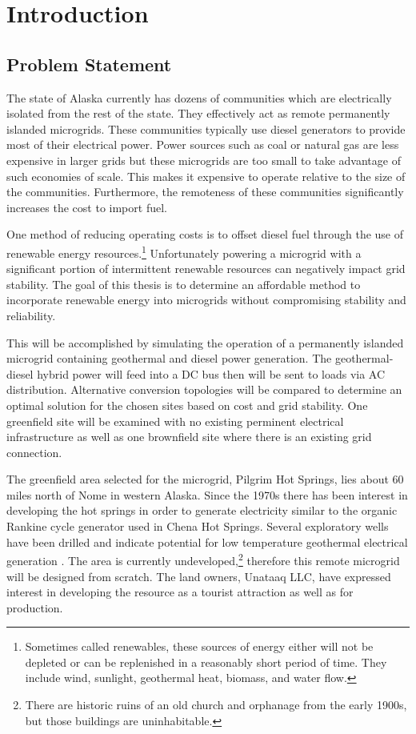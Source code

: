 \chapter{Introduction}
\label{ch:intro}

\section{Problem Statement}
The state of Alaska currently has dozens of communities which are electrically isolated from the rest of the state. They effectively act as remote permanently islanded microgrids. These communities typically use diesel generators to provide most of their electrical power. Power sources such as coal or natural gas are less expensive in larger grids but these microgrids are too small to take advantage of such economies of scale. This makes it expensive to operate relative to the size of the communities. Furthermore, the remoteness of these communities significantly increases the cost to import fuel.

One method of reducing operating costs is to offset diesel fuel through the use of renewable energy resources.\footnote{Sometimes called renewables, these sources of energy either will not be depleted or can be replenished in a reasonably short period of time. They include wind, sunlight, geothermal heat, biomass, and water flow.} Unfortunately powering a microgrid with a significant portion of intermittent renewable resources can negatively impact grid stability. The goal of this thesis is to determine an affordable method to incorporate renewable energy into microgrids without compromising stability and reliability. 

This will be accomplished by simulating the operation of a permanently islanded microgrid containing geothermal and diesel power generation. The geo\-ther\-mal\--die\-sel hybrid power will feed into a DC bus then will be sent to loads via AC distribution. Alternative conversion topologies will be compared to determine an optimal solution for the chosen sites based on cost and grid stability. One greenfield site will be examined with no existing perminent electrical infrastructure as well as one brownfield site where there is an existing grid connection.

The greenfield area selected for the microgrid, Pilgrim Hot Springs, lies about 60 miles north of Nome in western Alaska. Since the 1970s there has been interest in developing the hot springs in order to generate electricity similar to the organic Rankine cycle generator used in Chena Hot Springs. Several exploratory wells have been drilled and indicate potential for low temperature geothermal electrical generation \cite{Holdmann2013}. The area is currently undeveloped,\footnote{There are historic ruins of an old church and orphanage from the early 1900s, but those buildings are uninhabitable.} therefore this remote microgrid will be designed from scratch. The land owners, Unataaq LLC, have expressed interest in developing the resource as a tourist attraction as well as for production.

